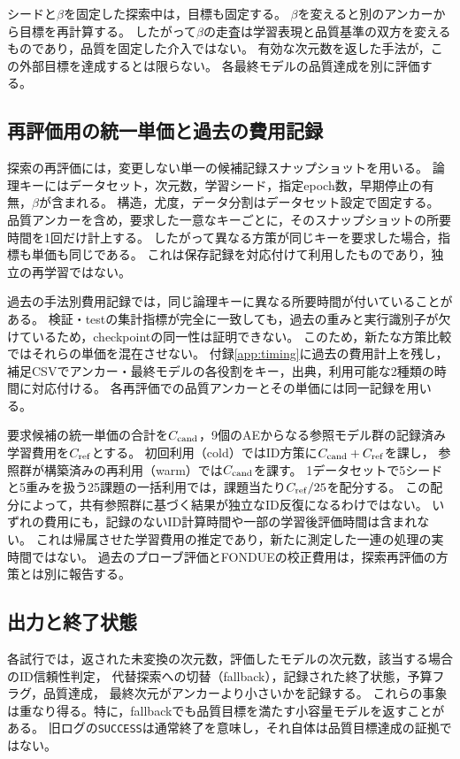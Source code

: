 \documentclass[11pt,a4paper]{ltjsarticle}
\begin{document}
シードと$\beta$を固定した探索中は，目標も固定する。
$\beta$を変えると別のアンカーから目標を再計算する。
したがって$\beta$の走査は学習表現と品質基準の双方を変えるものであり，品質を固定した介入ではない。
有効な次元数を返した手法が，この外部目標を達成するとは限らない。
各最終モデルの品質達成を別に評価する。

\subsection{再評価用の統一単価と過去の費用記録}\label{sec:cost}
探索の再評価には，変更しない単一の候補記録スナップショットを用いる。
論理キーにはデータセット，次元数，学習シード，指定epoch数，早期停止の有無，$\beta$が含まれる。
構造，尤度，データ分割はデータセット設定で固定する。
品質アンカーを含め，要求した一意なキーごとに，そのスナップショットの所要時間を1回だけ計上する。
したがって異なる方策が同じキーを要求した場合，指標も単価も同じである。
これは保存記録を対応付けて利用したものであり，独立の再学習ではない。

過去の手法別費用記録では，同じ論理キーに異なる所要時間が付いていることがある。
検証・testの集計指標が完全に一致しても，過去の重みと実行識別子が欠けているため，checkpointの同一性は証明できない。
このため，新たな方策比較ではそれらの単価を混在させない。
付録\ref{app:timing}に過去の費用計上を残し，補足CSVでアンカー・最終モデルの各役割をキー，出典，利用可能な2種類の時間に対応付ける。
各再評価での品質アンカーとその単価には同一記録を用いる。

要求候補の統一単価の合計を$C_{\rm cand}$，9個のAEからなる参照モデル群の記録済み学習費用を$C_{\rm ref}$とする。
初回利用（cold）ではID方策に$C_{\rm cand}+C_{\rm ref}$を課し，
参照群が構築済みの再利用（warm）では$C_{\rm cand}$を課す。
1データセットで5シードと5重みを扱う25課題の一括利用では，課題当たり$C_{\rm ref}/25$を配分する。
この配分によって，共有参照群に基づく結果が独立なID反復になるわけではない。
いずれの費用にも，記録のないID計算時間や一部の学習後評価時間は含まれない。
これは帰属させた学習費用の推定であり，新たに測定した一連の処理の実時間ではない。
過去のプローブ評価とFONDUEの校正費用は，探索再評価の方策とは別に報告する。

\subsection{出力と終了状態}\label{sec:outcomes}
各試行では，返された未変換の次元数，評価したモデルの次元数，該当する場合のID信頼性判定，
代替探索への切替（fallback），記録された終了状態，予算フラグ，品質達成，
最終次元がアンカーより小さいかを記録する。
これらの事象は重なり得る。特に，fallbackでも品質目標を満たす小容量モデルを返すことがある。
旧ログの\texttt{SUCCESS}は通常終了を意味し，それ自体は品質目標達成の証拠ではない。
\end{document}
